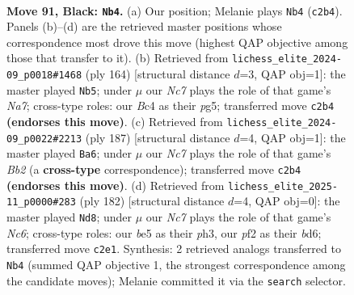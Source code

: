 \documentclass[11pt]{article}
\begin{document}
\clearpage

\begin{figure}[p]\centering
\begin{subfigure}{0.46\textwidth}\centering
\resizebox{\linewidth}{!}{%
\newchessgame
\chessboard[
  setfen={8/7k/8/4B3/2b5/7K/2n2P2/8 b - - 28 91},
  showmover=false,
  pgfstyle=straightmove, color=movearrow, markmove={c2-b4}
]}
\caption{}
\end{subfigure}\hfill
\begin{subfigure}{0.46\textwidth}\centering
\resizebox{\linewidth}{!}{%
\newchessgame
\chessboard[
  setfen={8/N7/8/3b2p1/8/4K1k1/8/8 w - - 2 83},
  showmover=false,
  pgfstyle=straightmove, color=movearrow, markmove={a7-b5}
]}
\caption{}
\end{subfigure}
\\[4pt]
\begin{subfigure}{0.46\textwidth}\centering
\resizebox{\linewidth}{!}{%
\newchessgame
\chessboard[
  setfen={8/1b6/1P5B/8/8/1K6/8/1k6 b - - 16 94},
  showmover=false,
  pgfstyle=straightmove, color=movearrow, markmove={b7-a6}
]}
\caption{}
\end{subfigure}\hfill
\begin{subfigure}{0.46\textwidth}\centering
\resizebox{\linewidth}{!}{%
\newchessgame
\chessboard[
  setfen={8/8/2Nb4/8/4k3/7p/8/7K w - - 10 92},
  showmover=false,
  pgfstyle=straightmove, color=movearrow, markmove={c6-d8}
]}
\caption{}
\end{subfigure}
\caption{\textbf{Move 91, Black: \texttt{Nb4}.} (a) Our position; Melanie plays \texttt{Nb4} (\texttt{c2b4}). Panels (b)--(d) are the retrieved master positions whose correspondence most drove this move (highest QAP objective among those that transfer to it). (b) Retrieved from \texttt{lichess\_elite\_2024-09\_p0018\#1468} (ply 164) [structural distance $d$=3, QAP obj=1]: the master played \texttt{Nb5}; under $\mu$ our \emph{Nc7} plays the role of that game's \emph{Na7}; cross-type roles: our \emph{B}c4 as their \emph{p}g5; transferred move \texttt{c2b4} \textbf{(endorses this move)}. (c) Retrieved from \texttt{lichess\_elite\_2024-09\_p0022\#2213} (ply 187) [structural distance $d$=4, QAP obj=1]: the master played \texttt{Ba6}; under $\mu$ our \emph{Nc7} plays the role of that game's \emph{Bb2} (a \textbf{cross-type} correspondence); transferred move \texttt{c2b4} \textbf{(endorses this move)}. (d) Retrieved from \texttt{lichess\_elite\_2025-11\_p0000\#283} (ply 182) [structural distance $d$=4, QAP obj=0]: the master played \texttt{Nd8}; under $\mu$ our \emph{Nc7} plays the role of that game's \emph{Nc6}; cross-type roles: our \emph{b}e5 as their \emph{p}h3, our \emph{p}f2 as their \emph{b}d6; transferred move \texttt{c2e1}. Synthesis: 2 retrieved analogs transferred to \texttt{Nb4} (summed QAP objective 1, the strongest correspondence among the candidate moves); Melanie committed it via the \texttt{search} selector.}
\label{fig:thought-m181}
\end{figure}
\end{document}
